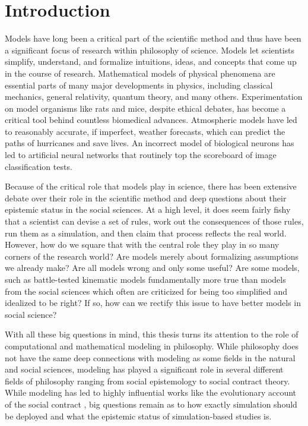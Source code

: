 \hypertarget{introduction}{%
\chapter{Introduction}\label{introduction}}

Models have long been a critical part of the scientific method and thus
have been a significant focus of research within philosophy of science.
Models let scientists simplify, understand, and formalize intuitions,
ideas, and concepts that come up in the course of research. Mathematical
models of physical phenomena are essential parts of many major
developments in physics, including classical mechanics, general
relativity, quantum theory, and many others. Experimentation on model
organisms like rats and mice, despite ethical debates, has become a
critical tool behind countless biomedical advances. Atmospheric models
have led to reasonably accurate, if imperfect, weather forecasts, which
can predict the paths of hurricanes and save lives. An incorrect model
of biological neurons has led to artificial neural networks that
routinely top the scoreboard of image classification tests.

Because of the critical role that models play in science, there has been
extensive debate over their role in the scientific method and deep
questions about their epistemic status in the social sciences. At a high
level, it does seem fairly fishy that a scientist can devise a set of
rules, work out the consequences of those rules, run them as a
simulation, and then claim that process reflects the real world.
However, how do we square that with the central role they play in so
many corners of the research world? Are models merely about formalizing
assumptions we already make? Are all models wrong and only some useful?
Are some models, such as battle-tested kinematic models fundamentally
more true than models from the social sciences which often are
criticized for being too simplified and idealized to be right? If so,
how can we rectify this issue to have better models in social science?

With all these big questions in mind, this thesis turns its attention to
the role of computational and mathematical modeling in philosophy. While
philosophy does not have the same deep connections with modeling as some
fields in the natural and social sciences, modeling has played a
significant role in several different fields of philosophy ranging from
social epistemology to social contract theory. While modeling has led to
highly influential works like the evolutionary account of the social
contract \autocite{skyrmsEvolutionSocialContract2014}, big questions
remain as to how exactly simulation should be deployed and what the
epistemic status of simulation-based studies is.

